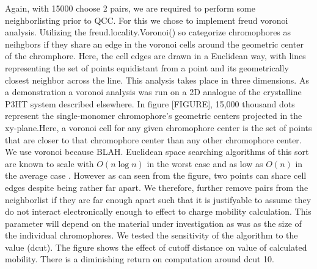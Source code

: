 Again, with 15000 choose 2 pairs, we are required to perform some neighborlisting prior to QCC. For this we chose to
implement freud voronoi analysis. Utilizing the freud.locality.Voronoi() so categorize chromophores as
neihgbors if they share an edge in the voronoi cells around the geometric center of the chromphore. Here, the
cell edges are drawn in a Euclidean way, with lines representing the set of points equidistant from a point
and its geometrically closest neighbor across the line. This analysis takes place in three dimensions. As a
demonstration a voronoi analysis was run on a 2D analogue of the crystalline P3HT system described elsewhere.
In figure [FIGURE], 15,000 thousand dots represent the single-monomer chromophore's geometric centers projected
in the xy-plane.Here,
a voronoi cell for any given chromophore center is the set of points that are closer to that chromophore
center than any other chromophore center. We use voronoi because BLAH. Euclidean space searching algorithms of
this sort are known to scale with $O(n\log{n})$ in the worst case and as low as $O(n)$ in the average case
\cite{Bentley1980}.
However as can seen from the figure, two points can share cell edges despite being rather far apart. We
therefore, further remove pairs from the neighborlist if they are far enough apart such that it is justifyable
to assume they do not interact electronically enough to effect to charge mobility calculation. This parameter will
depend on the material under investigation as was as the size of the individual chromophores. We tested the
sensitivity of the algorithm to the value (dcut). The figure shows the effect of cutoff distance on value of
calculated mobility. There is a diminishing return on computation around dcut 10. 


